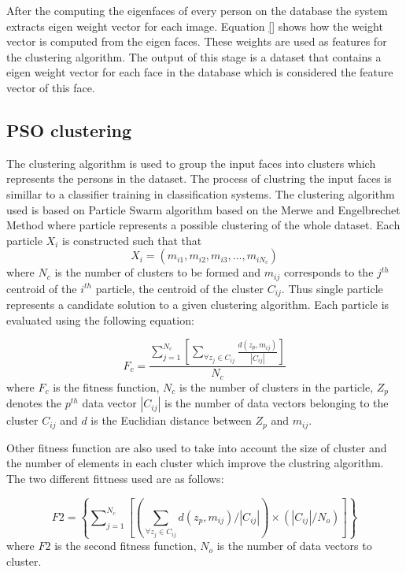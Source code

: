 \documentclass[a4paper,twoside]{article}
\begin{document}
After the computing the eigenfaces of every person on the database the system extracts eigen weight vector for each image. Equation \ref{} shows how the weight vector is computed from the eigen faces. These weights are used as features for the clustering algorithm. The output of this stage is a dataset that contains a eigen weight vector for each face in the database which is considered the feature vector of this face.


\subsection{PSO clustering}
\label{sec:psoClustering}

The clustering algorithm is used to group the input faces into clusters which represents the persons in the dataset. The process of clustring the input faces is simillar to a classifier training in classification systems.    The clustering algorithm used is based on Particle Swarm algorithm  based on the Merwe and Engelbrechet \cite{psoclustering} Method where particle represents a possible clustering of the whole dataset.  Each particle $X_i$ is constructed such that that
\begin{equation}
X_i=\left( m_{i1}, m_{i2}, m_{i3},\dots, m_{iN_c}\right)
\end{equation}
where $N_c$ is the number of clusters to be formed and $m_{ij}$ corresponds to the $j^{th}$ centroid of the  $i^{th}$ particle, the centroid of the cluster $C_{ij}$. Thus single particle represents a candidate solution to a given clustering algorithm. Each particle is evaluated using the following equation:

\begin{equation}
F_c  = \frac{{\sum\nolimits_{j = 1}^{N_c } {\left[ {\sum\limits_{\forall z_j  \in C_{ij} } {\frac{{d(z_p ,m_{ij} )}}{{\left| {C_{ij} } \right|}}} } \right]} }}{{N_c }}
\end{equation}
where $F_c$ is the fitness function, $N_c$ is the number of clusters in the particle, $Z_p$ denotes the $p^{th}$ data vector $\left| {C_{ij} } \right|$ is the number of data vectors belonging to the cluster $C_{ij}$ and $d$ is the Euclidian distance between $Z_p$ and $m_{ij}$.

Other fitness function are also used to take into account the size of cluster and the number of elements in each cluster which improve the clustring algorithm. The two different fittness used are as follows:

\begin{equation}
F2 =  \left\{ \sum\nolimits_{j=1}^{N_c} \left[ \left( \sum\limits_{\forall z_j \in C_{ij}} d(z_p ,m_{ij} )/\left|{C_{ij} }\right| \right) \times  \left(  \left|{C_{ij} }\right| /N_o\right)\right]\right\}
\end{equation}
where $F2$ is the second fitness function, $N_o$ is the number of data vectors to cluster.
\end{document}
